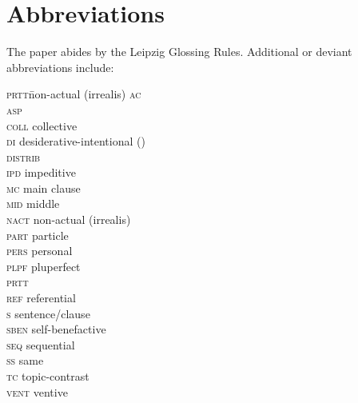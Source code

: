 \documentclass[output=paper]{langsci/langscibook}
\begin{document}
\section*{Abbreviations}

The paper abides by the Leipzig Glossing Rules. Additional or deviant abbreviations include:

\begin{multicols}{2}
\begin{tabbing}
\textsc{prtt}\hspace{5mm}\=non-actual (irrealis) \hspace{5mm}\kill
\textsc{ac}  \>                 \\
\textsc{asp} \>                           \\
\textsc{coll}   \>  collective                  \\
\textsc{di} \>  desiderative-intentional () \\
\textsc{distrib}\>                 \\
\textsc{ipd} \> impeditive                      \\
\textsc{mc}  \> main clause                      \\
\textsc{mid} \> middle                     \\
\textsc{nact}\>  non-actual (irrealis)      \\
\textsc{part}\>  particle                       \\
\textsc{pers}\>  personal                       \\
\textsc{plpf}\>  pluperfect                     \\
\textsc{prtt}\>                        \\
\textsc{ref} \> referential                     \\
\textsc{s}  \>    sentence/clause              \\
\textsc{sben}\>  self-benefactive               \\
\textsc{seq} \> sequential                      \\
\textsc{ss} \>  same                    \\
\textsc{tc} \>  topic-contrast                  \\
\textsc{vent}\>  ventive                        
\end{tabbing}
\end{multicols}
\end{document}
